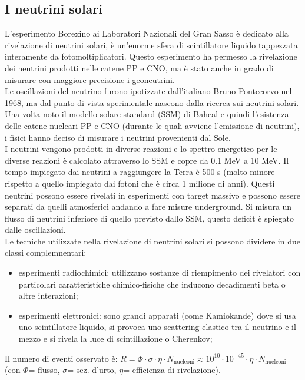 \documentclass[11pt, oneside]{article}   	%
\begin{document}
\subsection{I neutrini solari}
L'esperimento Borexino ai Laboratori Nazionali del Gran Sasso è dedicato alla rivelazione di neutrini solari, è un'enorme sfera di scintillatore liquido tappezzata interamente da fotomoltiplicatori. Questo esperimento ha permesso la rivelazione dei neutrini prodotti nelle catene PP e CNO, ma è stato anche in grado di misurare con maggiore precisione i geoneutrini. \\
Le oscillazioni del neutrino furono ipotizzate dall'italiano Bruno Pontecorvo nel 1968, ma dal punto di vista sperimentale nascono dalla ricerca sui neutrini solari. Una volta noto il modello solare standard (SSM) di Bahcal e quindi l'esistenza delle catene nucleari PP e CNO (durante le quali avviene l'emissione di neutrini), i fisici hanno deciso di misurare i neutrini provenienti dal Sole. \\
I neutrini vengono prodotti in diverse reazioni e lo spettro energetico per le diverse reazioni è calcolato attraverso lo SSM e copre da 0.1 MeV a 10 MeV. Il tempo impiegato dai neutrini a raggiungere la Terra è 500 s (molto minore rispetto a quello impiegato dai fotoni che è circa 1 milione di anni). Questi neutrini possono essere rivelati in esperimenti con target massivo e possono essere separati da quelli atmosferici andando a fare misure underground. Si misura un flusso di neutrini inferiore di quello previsto dallo SSM, questo deficit è spiegato dalle oscillazioni.\\ 
Le tecniche utilizzate nella rivelazione di neutrini solari si possono dividere in due classi complemnentari:

\begin{itemize}
	\item esperimenti radiochimici: utilizzano sostanze di riempimento dei rivelatori con particolari caratteristiche chimico-fisiche che inducono decadimenti beta o altre interazioni;
	\item esperimenti elettronici: sono grandi apparati (come Kamiokande) dove si usa uno scintillatore liquido, si provoca uno scattering elastico tra il neutrino e il mezzo e si rivela la luce di scintillazione o Cherenkov;
\end{itemize}


\noindent Il numero di eventi osservato è: $R = \Phi \cdot \sigma \cdot \eta \cdot N_{\text{nucleoni}} \approx 10^{10} \cdot 10^{-45} \cdot \eta \cdot N_{\text{nucleoni}}$ (con $\Phi$= flusso, $\sigma$= sez. d'urto, $\eta$= efficienza di rivelazione). 
\end{document}
